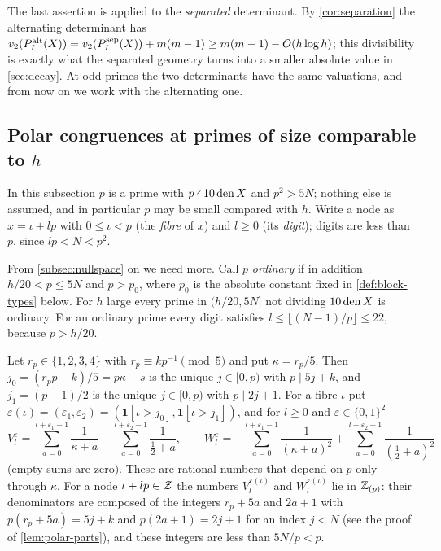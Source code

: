 The last assertion is applied to the \emph{separated} determinant. By \cref{cor:separation} the
alternating determinant has $v_2(P^{\mathrm{alt}}_I(X))=v_2(P^{\mathrm{sep}}_I(X))+m(m-1)\ge m(m-1)-O(h\log h)$;
this divisibility is exactly what the separated geometry turns into a smaller absolute value in
\cref{sec:decay}. At odd primes the two determinants have the same valuations, and from now on
we work with the alternating one.

\subsection{Polar congruences at primes of size comparable to \texorpdfstring{$h$}{h}}\label{subsec:polar}

In this subsection $p$ is a prime with $p\nmid10\operatorname{den} X$ and $p^2>5N$; nothing else is assumed,
and in particular $p$ may be small compared with $h$. Write a node as $x=\iota+lp$ with
$0\le\iota<p$ (the \emph{fibre} of $x$) and $l\ge0$ (its \emph{digit}); digits are less than $p$,
since $lp<N<p^2$.

From \cref{subsec:nullspace} on we need more. Call $p$ \emph{ordinary} if in addition
$h/20<p\le5N$ and $p>p_0$, where $p_0$ is the absolute constant fixed in \cref{def:block-types}
below. For $h$ large every prime in $(h/20,5N]$ not dividing $10\operatorname{den} X$ is ordinary. For an
ordinary prime every digit satisfies $l\le\lfloor(N-1)/p\rfloor\le22$, because $p>h/20$.

Let $r_p\in\{1,2,3,4\}$ with $r_p\equiv kp^{-1}\pmod5$ and put $\kappa=r_p/5$. Then
$j_0=(r_pp-k)/5=p\kappa-s$ is the unique $j\in[0,p)$ with $p\mid5j+k$, and $j_1=(p-1)/2$ is the
unique $j\in[0,p)$ with $p\mid2j+1$. For a fibre $\iota$ put
$\varepsilon(\iota)=(\varepsilon_1,\varepsilon_2)=(\mathbf1[\iota>j_0],\mathbf1[\iota>j_1])$,
and for $l\ge0$ and $\varepsilon\in\{0,1\}^2$
\begin{equation}\label{eq:VW-def}
  V^\varepsilon_l=\sum_{a=0}^{l+\varepsilon_1-1}\frac1{\kappa+a}
                 -\sum_{a=0}^{l+\varepsilon_2-1}\frac1{\frac12+a},\qquad
  W^\varepsilon_l=-\sum_{a=0}^{l+\varepsilon_1-1}\frac1{(\kappa+a)^2}
                 +\sum_{a=0}^{l+\varepsilon_2-1}\frac1{(\frac12+a)^2}
\end{equation}
(empty sums are zero). These are rational numbers that depend on $p$ only through $\kappa$. For
a node $\iota+lp\in\mathcal{Z}$ the numbers $V^{\varepsilon(\iota)}_l$ and $W^{\varepsilon(\iota)}_l$ lie
in $\mathbb{Z}_{(p)}$: their denominators are composed of the integers $r_p+5a$ and $2a+1$ with
$p(r_p+5a)=5j+k$ and $p(2a+1)=2j+1$ for an index $j<N$ (see the proof of \cref{lem:polar-parts}),
and these integers are less than $5N/p<p$.

